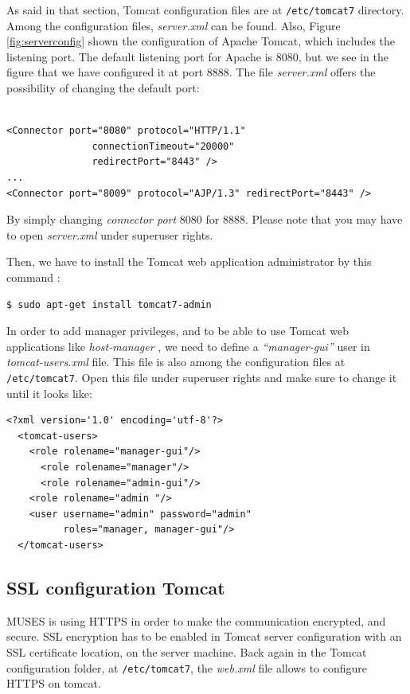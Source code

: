 \documentclass[a4paper,11pt]{book}
\begin{document}
As said in that section, Tomcat configuration files are at \texttt{/etc/tomcat7} directory. Among the configuration files, \textit{server.xml} can be found. Also, Figure \ref{fig:serverconfig} shown the configuration of Apache Tomcat, which includes the listening port. The default listening port for Apache is 8080, but we see in the figure that we have configured it at port 8888. The file \textit{server.xml} offers the possibility of changing the default port:
\\
\\
\begin{verbatim}
<Connector port="8080" protocol="HTTP/1.1" 
               connectionTimeout="20000" 
               redirectPort="8443" />
...
<Connector port="8009" protocol="AJP/1.3" redirectPort="8443" />
\end{verbatim}

By simply changing \textit{connector port} 8080 for 8888. Please note that you may have to open \textit{server.xml} under superuser rights.

Then, we have to install the Tomcat web application administrator by this command \cite{tomcatdocu:site}:

\begin{verbatim}
$ sudo apt-get install tomcat7-admin
\end{verbatim}

In order to add manager privileges, and to be able to use Tomcat web applications like \textit{host-manager} \cite{tomcatdocu:site}, we need to define a \textit{``manager-gui''} user in \textit{tomcat-users.xml} file. This file is also among the configuration files at \texttt{/etc/tomcat7}. Open this file under superuser rights and make sure to change it until it looks like:

\begin{verbatim}
<?xml version='1.0' encoding='utf-8'?>
  <tomcat-users>
    <role rolename="manager-gui"/>
 	  <role rolename="manager"/>
 	  <role rolename="admin-gui"/>
    <role rolename="admin "/>
    <user username="admin" password="admin"
          roles="manager, manager-gui"/>
  </tomcat-users>
\end{verbatim}

\subsection{SSL configuration Tomcat}
\label{subsec:ssltomcat}

MUSES is using HTTPS in order to make the communication encrypted, and secure. SSL encryption has to be enabled in Tomcat server configuration with an SSL certificate location, on the server machine. Back again in the Tomcat configuration folder, at \texttt{/etc/tomcat7}, the \textit{web.xml} file allows to configure HTTPS on tomcat.
\end{document}
